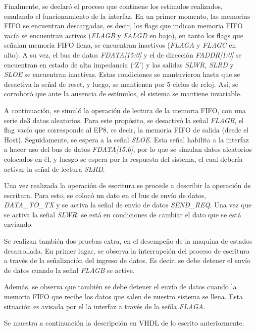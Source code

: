 Finalmente, se declaró el proceso que continene los estimulos realizados, emulando el funcionamiento de la interfaz. En un primer momento, las memorias FIFO se encuentran descargadas, es decir, los flags que indican memoria FIFO vacía se encuentran activos ({\it FLAGB} y {\it FALGD} en bajo), en tanto los flags que señalan memoria FIFO llena, se encuentran inactivos ({\it FLAGA} y {\it FLAGC} en alto).
A su vez, el bus de datos {\it FDATA[15:0]} y el de dirección {\it FADDR[1:0]} se encuentran en estado de alta impedancia (`Z') y las salidas {\it SLWR, SLRD} y {\it SLOE} se encuentran inactivas. Estas condiciones se mantuvieron hasta que se desactiva la señal de reset, y luego, se mantienen por 5 ciclos de reloj. Así, se corroboró que ante la ausencia de estímulos, el sistema se mantiene invariable.

A continuación, se simuló la operación de lectura de la memoria FIFO, con una serie de3 datos aleatorios. Para este propósito, se desactivó la señal {\it FLAGB}, el flag vacío que corresponde al EP8, es decir, la memoria FIFO de salida (desde el Host). Seguidamente, se espera a la señal {\it SLOE}. Esta señal habilita a la interfaz a hacer uso del bus de datos {\it FDATA[15:0]}, por lo que se simulan datos aleatorios colocados en él, y luesgo se espera por la respuesta del sistema, el cual debería activar la señal de lectura {\it SLRD}.

Una vez realizada la operación de escritura se procede a describir la operación de escritura. Para esto, se colocó un dato en el bus de envío de datos, {\it DATA\_TO\_TX} y se activa la señal de envío de datos {\it SEND\_REQ}. Una vez que se activa la señal {\it SLWR}, se está en condiciones de cambiar el dato que se está enviando.

Se realizan también dos pruebas extra, en el desempeño de la maquina de estados desarrollada. En primer lugar, se observa la interrupción del proceso de escritura a través de la señalización del ingreso de datos. Es decir, se debe detener el envío de datos cuando la señal {\it FLAGB} se active.

Además, se observa que también se debe detener el envío de datos cuando la memoria FIFO que recibe los datos que salen de nuestro sistema se llena. Esta situación es avisada por el la interfaz a través de la señla {\it FLAGA}.

Se muestra a continuación la descripción en VHDL de lo escrito anteriormente.

